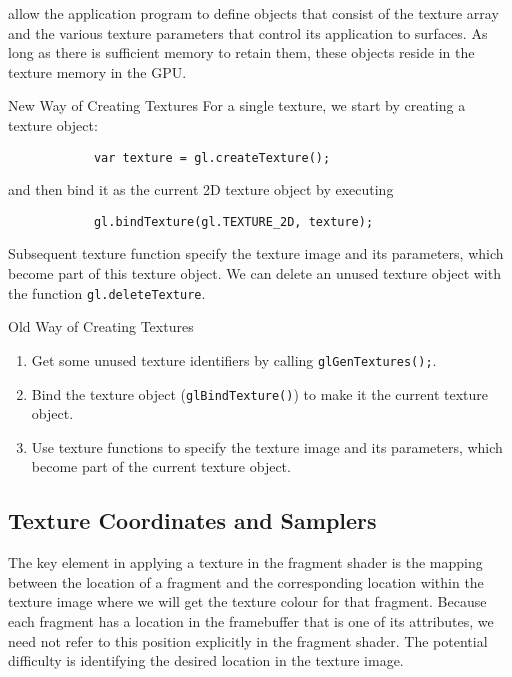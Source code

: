 \documentclass[../COS3712_Notes.tex]{subfiles}
\begin{document}
         allow the application program to define objects that consist
        of the texture array and the various texture parameters that control its application
        to surfaces.
        As long as there is sufficient memory to retain them, these objects reside in the
        texture memory in the GPU.

        \begin{sidenote}{New Way of Creating Textures}
          For a single texture, we start by creating a texture object:
          \begin{verbatim}
            var texture = gl.createTexture();
          \end{verbatim}
          and then bind it as the current 2D texture object by executing
          \begin{verbatim}
            gl.bindTexture(gl.TEXTURE_2D, texture);
          \end{verbatim}
          Subsequent texture function specify the texture image and its parameters,
          which become part of this texture object.
          We can delete an unused texture object with the function
          \texttt{gl.deleteTexture}.
        \end{sidenote}

        \begin{sidenote}{Old Way of Creating Textures}
          $ $\vspace{-1em}
          \begin{enumerate}
            \item Get some unused texture identifiers by calling
              \texttt{glGenTextures();}.
            \item Bind the texture object (\texttt{glBindTexture()}) to make
              it the current texture object.
            \item Use texture functions to specify the texture image and its parameters,
              which become part of the current texture object.
          \end{enumerate}
        \end{sidenote}

      \subsection{Texture Coordinates and Samplers}
        The key element in applying a texture in the fragment shader is the mapping
        between the location of a fragment and the corresponding location within the texture image
        where we will get the texture colour for that fragment.
        Because each fragment has a location in the framebuffer that is one of its attributes,
        we need not refer to this position explicitly in the fragment shader.
        The potential difficulty is identifying the desired location in the texture image.
\end{document}
